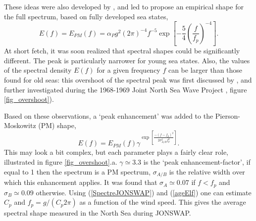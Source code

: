 These ideas were also developed by \cite{Kitaigorodskii1962}, and  led \cite{Pierson&Moskowitz1964} to propose an empirical 
shape for the full spectrum, based on fully developed sea states, 
\begin{equation}
   E(f)=E_{PM}(f)=\alpha_{P} g^2 \left(2\pi\right)^{-4} f^{-5} \exp\left[-\frac{5}{4}
   \left(\frac{f}{f_p}\right)^{-4}\right].
\end{equation}
At short fetch, it was soon realized that spectral shapes could be significantly different. 
The peak is particularly narrower for young sea states. Also, the values of the spectral density $E(f)$ for a given frequency $f$
can be larger than those found for old seas: this overshoot of the spectral peak was first discussed by \cite{Barnett&Sutherland1968}, 
and further investigated during the 1968-1969 Joint North
Sea Wave Project \citep[JONSWAP, see][]{JONSWAP},
figure \ref{fig_overshoot}).

Based on these observations, a `peak enhancement' was added to the Pierson-Moskowitz (PM) shape, 
\begin{equation}
   E(f)=E_{PM}(f) \gamma^{\exp\left[\frac{-\left(f-f_p\right)^2}{2 \sigma_{A/B}^2
   f_p^2}\right]}. \label{SpectreJONSWAP}
\end{equation}
This may look a bit complex, but each parameter plays a fairly clear role, illustrated in figure \ref{fig_overshoot}.a. 
$\gamma \simeq 3.3$ is the `peak enhancement-factor', if equal to 1 then the spectrum is a PM spectrum,  $\sigma_{A/B}$ 
is the relative width over which this enhancement applies. It was found that  $\sigma_{A} \simeq 0.07$
if $f<f_p$ and $\sigma_{B} \simeq 0.09$ otherwise. Using (\ref{SpectreJONSWAP}) and (\ref{ageElf}) one can estimate 
 $C_p$ and $f_p=g/(C_p 2 \pi)$ as a function of the wind speed. This gives the average spectral shape measured 
in the North Sea during JONSWAP. 

